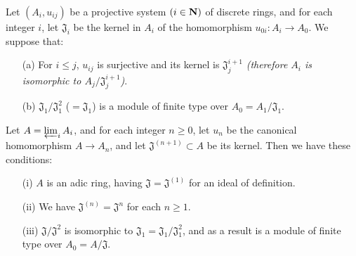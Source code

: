 \begin{prop}[7.2.7]
\label{prop-0.7.2.7}
Let $(A_i,u_{ij})$ be a projective system $(i\in\mathbf{N})$ of discrete rings, and
for each integer $i$, let $\mathfrak{J}_i$ be the kernel in $A_i$ of the
homomorphism $u_{0i}:A_i\to A_0$. We suppose that:
\begin{itemize}
  \item[{\rm(a)}] For $i\leqslant j$, $u_{ij}$ is surjective and its kernel is $\mathfrak{J}_j^{i+1}$
    {\em (therefore $A_i$ is isomorphic to $A_j/\mathfrak{J}_j^{i+1}$)}.
  \item[{\rm(b)}] $\mathfrak{J}_1/\mathfrak{J}_1^2$ ($=\mathfrak{J}_1$) is a module of
    finite type over $A_0=A_1/\mathfrak{J}_1$.
\end{itemize}
Let $A=\varprojlim_i A_i$, and for each integer $n\geqslant 0$, let $u_n$ be the
canonical homomorphism $A\to A_n$, and let $\mathfrak{J}^{(n+1)}\subset A$ be
its kernel. Then we have these conditions:
\begin{itemize}
  \item[{\rm(i)}] $A$ is an adic ring, having $\mathfrak{J}=\mathfrak{J}^{(1)}$ for an
    ideal of definition.
  \item[{\rm(ii)}] We have $\mathfrak{J}^{(n)}=\mathfrak{J}^n$ for each $n\geqslant 1$.
  \item[{\rm(iii)}] $\mathfrak{J}/\mathfrak{J}^2$ is isomorphic to
    $\mathfrak{J}_1=\mathfrak{J}_1/\mathfrak{J}_1^2$, and as a result is a module of finite type
    over $A_0=A/\mathfrak{J}$.
\end{itemize}
\end{prop}

